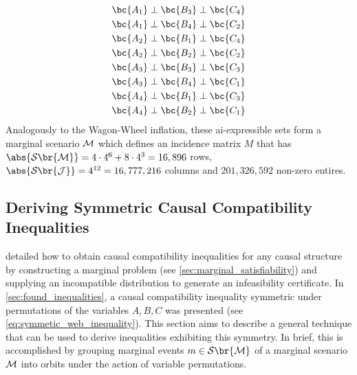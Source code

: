 \documentclass[aps, 10pt, english, twoside, pra, nofootinbib, tightenlines, longbibliography, superscriptaddress]{revtex4-1}
\renewcommand{\Events}[1]{\mathcal{S}\br{#1}} %
\begin{document}
\begin{equation*}
\begin{gathered}
            \bc{A_1} \ancestralindep \bc{B_3} \ancestralindep \bc{C_4} \\
            \bc{A_1} \ancestralindep \bc{B_4} \ancestralindep \bc{C_2} \\
            \bc{A_2} \ancestralindep \bc{B_1} \ancestralindep \bc{C_4} \\
            \bc{A_2} \ancestralindep \bc{B_2} \ancestralindep \bc{C_2} \\
            \bc{A_3} \ancestralindep \bc{B_3} \ancestralindep \bc{C_3} \\
            \bc{A_3} \ancestralindep \bc{B_4} \ancestralindep \bc{C_1} \\
            \bc{A_4} \ancestralindep \bc{B_1} \ancestralindep \bc{C_3} \\
            \bc{A_4} \ancestralindep \bc{B_2} \ancestralindep \bc{C_1}
        \end{gathered}
    \end{equation*}
    Analogously to the Wagon-Wheel inflation, these ai-expressible sets form a marginal scenario $\mathcal{M}$ which defines an incidence matrix $M$ that has $\abs{\Events{\mscenario}} = 4 \cdot 4^{6} + 8 \cdot 4^3 = 16,896$ rows, $\abs{\Events{\jointvar}} = 4^{12} = 16,777,216$ columns and $201,326,592$ non-zero entires.

    \subsection{Deriving Symmetric Causal Compatibility Inequalities}
    \label{sec:symmetric_inequalities}

     detailed how to obtain causal compatibility inequalities for any causal structure by constructing a marginal problem (see \cref{sec:marginal_satisfiability}) and supplying an incompatible distribution to generate an infeasibility certificate. In \cref{sec:found_inequalities}, a causal compatibility inequality symmetric under permutations of the variables $A,B,C$ was presented (see \cref{eq:symmetic_web_inequality}). This section aims to describe a general technique that can be used to derive inequalities exhibiting this symmetry. In brief, this is accomplished by grouping marginal events $m \in \Events{\mscenario}$ of a marginal scenario $\mathcal{M}$ into orbits under the action of variable permutations.
\end{document}
